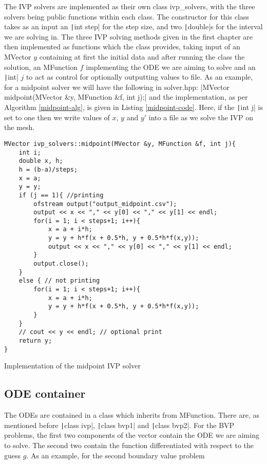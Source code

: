 \documentclass[a4paper,11pt]{report}
\begin{document}
The IVP solvers are implemented as their own class ivp\_solvers, with the three solvers being public functions within each class. The constructor for this class takes as an input an \texttt|int step| for the step size, and two \texttt|double|s for the interval we are solving in. The three IVP solving methods given in the first chapter are then implemented as functions which the class provides, taking input of an MVector $y$ containing at first the initial data and after running the class the solution, an MFunction $f$ implementing the ODE we are aiming to solve and an \texttt|int| $j$ to act as control for optionally outputting values to file. As an example, for a midpoint solver we will have the following in solver.hpp:
|MVector midpoint(MVector &y, MFunction &f, int j);|
and the implementation, as per Algorithm \ref{midpoint-alg}, is given in Listing \ref{midpoint-code}. Here, if the \texttt|int j| is set to one then we write values of $x$, $y$ and $y'$ into a file as we solve the IVP on the mesh.
\begin{listing}
\begin{verbatim}
MVector ivp_solvers::midpoint(MVector &y, MFunction &f, int j){
	int i;
	double x, h;
	h = (b-a)/steps;
	x = a;
	y = y;
	if (j == 1){ //printing
		ofstream output("output_midpoint.csv");
		output << x << "," << y[0] << "," << y[1] << endl;
		for(i = 1; i < steps+1; i++){
			x = a + i*h;
			y = y + h*f(x + 0.5*h, y + 0.5*h*f(x,y));
			output << x << "," << y[0] << "," << y[1] << endl;
		}
		output.close();
	}
	else { // not printing
		for(i = 1; i < steps+1; i++){
			x = a + i*h;
			y = y + h*f(x + 0.5*h, y + 0.5*h*f(x,y));
		}
	}
	// cout << y << endl; // optional print
	return y;
}
\end{verbatim}
\caption{Implementation of the midpoint IVP solver}
\label{midpoint-code}
\end{listing}

\subsection{ODE container}

The ODEs are contained in a class which inherits from MFunction. There are, as mentioned before \texttt|class ivp|, \texttt|class bvp1| and \texttt|class bvp2|. For the BVP problems, the first two components of the vector contain the ODE we are aiming to solve. The second two contain the function differentiated with respect to the guess $g$. As an example, for the second boundary value problem
\end{document}

